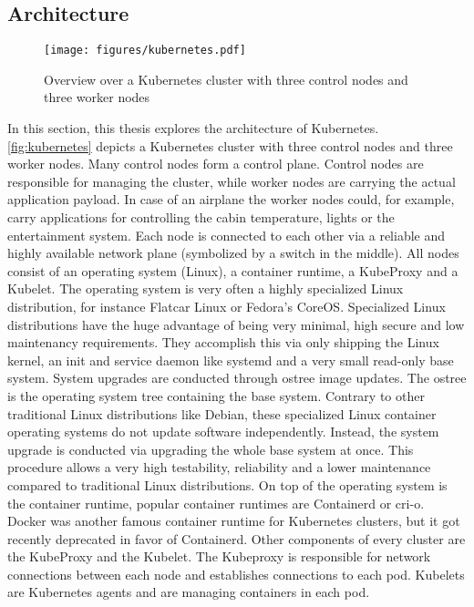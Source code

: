 \documentclass[titlepage]{report}
\begin{document}
\subsection{Architecture}
\begin{figure}[H]
    \centering
    \texttt{[image: figures/kubernetes.pdf]}
    \caption{Overview over a Kubernetes cluster with three control nodes and three worker nodes}\label{fig:kubernetes}
\end{figure}
In this section, this thesis explores the architecture of Kubernetes. \autoref{fig:kubernetes} depicts a Kubernetes cluster with three control nodes and three worker nodes. Many control nodes form a control plane.
Control nodes are responsible for managing the cluster, while worker nodes are carrying the actual application payload. In case of an airplane the worker nodes could, for example, carry applications for controlling
the cabin temperature, lights or the entertainment system. Each node is connected to each other via a reliable and highly available network plane (symbolized by a switch in the middle). All nodes consist of
an operating system (Linux), a container runtime, a KubeProxy and a Kubelet. The operating system is very often a highly specialized Linux distribution, for instance Flatcar Linux\cite{FlatcarLinux} or Fedora's CoreOS\cite{FedoraCoreOS}.
Specialized Linux distributions have the huge advantage of being very minimal, high secure and low maintenancy requirements. They accomplish this via only shipping the Linux kernel, an init and service daemon like systemd\cite{systemd}
and a very small read-only base system. System upgrades are conducted through ostree image updates. The ostree is the operating system tree containing the base system. Contrary to other traditional Linux distributions like Debian,
these specialized Linux container operating systems do not update software independently. Instead, the system upgrade is conducted via upgrading the whole base system at once. This procedure allows a very high testability, reliability
and a lower maintenance compared to traditional Linux distributions. On top of the operating system is the container runtime, popular container runtimes are Containerd\cite{Containerd} or cri-o\cite{CRIO}. Docker was another famous
container runtime for Kubernetes clusters, but it got recently deprecated in favor of Containerd\cite{KubernetesDockerNews}. Other components of every cluster are the KubeProxy and the Kubelet. The Kubeproxy is responsible
for network connections between each node and establishes connections to each pod\cite{KubernetesComponents}. Kubelets are Kubernetes agents and are managing containers in each pod.
\end{document}
